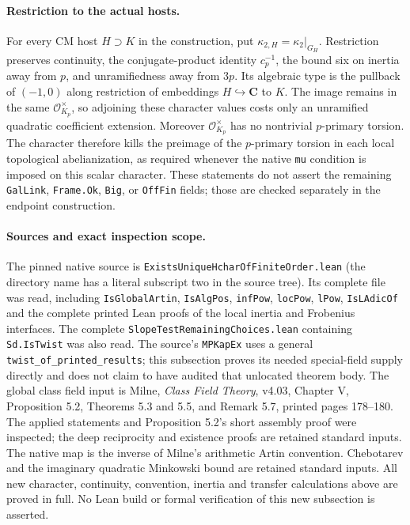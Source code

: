\paragraph{Restriction to the actual hosts.}
For every CM host \(H\supset K\) in the construction, put
\(\kappa_{2,H}=\kappa_2|_{G_H}\).  Restriction preserves continuity,
the conjugate-product identity \(c_p^{-1}\), the bound six on inertia
away from \(p\), and unramifiedness away from \(3p\).  Its algebraic
type is the pullback of \((-1,0)\) along restriction of embeddings
\(H\hookrightarrow\mathbf C\) to \(K\).
The image remains in the same \(\mathcal O_{K_p}^{\times}\), so adjoining
these character values costs only an unramified quadratic coefficient
extension.  Moreover \(\mathcal O_{K_p}^{\times}\) has no nontrivial
\(p\)-primary torsion.  The character therefore kills the preimage of
the \(p\)-primary torsion in each local topological abelianization,
as required whenever the native \texttt{mu} condition is imposed on
this scalar character.  These statements do not assert the remaining
\texttt{GalLink}, \texttt{Frame.Ok}, \texttt{Big}, or \texttt{OffFin}
fields; those are checked separately in the endpoint construction.

\paragraph{Sources and exact inspection scope.}
The pinned native source is
\texttt{ExistsUniqueHcharOfFiniteOrder.lean} (the directory name has a
literal subscript two in the source tree).  Its complete file was read,
including \texttt{IsGlobalArtin}, \texttt{IsAlgPos}, \texttt{infPow},
\texttt{locPow}, \texttt{lPow}, \texttt{IsLAdicOf} and the complete
printed Lean proofs of the local inertia and Frobenius interfaces.
The complete \texttt{SlopeTestRemainingChoices.lean} containing
\texttt{Sd.IsTwist} was also read.  The source's \texttt{MPKapEx}
uses a general \texttt{twist\_of\_printed\_results}; this subsection
proves its needed special-field supply directly and does not claim
to have audited that unlocated theorem body.
The global class field input is Milne, \emph{Class Field Theory},
v4.03, Chapter V, Proposition 5.2, Theorems 5.3 and 5.5, and
Remark 5.7, printed pages 178--180.  The applied statements and
Proposition 5.2's short assembly proof were inspected; the deep
reciprocity and existence proofs are retained standard inputs.
The native map is the inverse of Milne's arithmetic Artin convention.
Chebotarev and the imaginary quadratic Minkowski bound are retained
standard inputs.  All new character, continuity, convention, inertia
and transfer calculations above are proved in full.  No Lean build
or formal verification of this new subsection is asserted.
